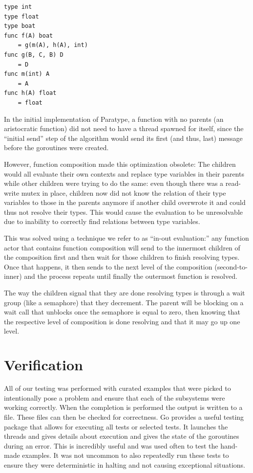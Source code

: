 \documentclass{acm_proc_article-sp}
\begin{document}
		\begin{lstlisting}[caption=Small Example of function composition,
		language=Paratype, label=lst:composition] 
type int
type float
type boat
func f(A) boat
	= g(m(A), h(A), int)
func g(B, C, B) D
	= D
func m(int) A
	= A
func h(A) float
	= float
		\end{lstlisting}

		In the initial implementation of Paratype, a function with no parents
		(an aristocratic function) did not need to have a thread spawned for
		itself, since the ``initial send'' step of the algorithm would send its
		first (and thus, last) message before the goroutines were created.

		However, function composition made this optimization obsolete: The
		children would all evaluate their own contexts and replace type
		variables in their parents while other children were trying to do the
		same: even though there was a read-write mutex in place, children now
		did not know the relation of their type variables to those in the
		parents anymore if another child overwrote it and could thus not
		resolve their types. This would cause the evaluation to be unresolvable
		due to inability to correctly find relations between type variables.

		This was solved using a technique we refer to as ``in-out evaluation:''
		any function actor that contains function composition will send to the
		innermost children of the composition first and then wait for those
		children to finish resolving types. Once that happens, it then sends
		to the next level of the composition (second-to-inner) and the process
		repeats until finally the outermost function is resolved.

		The way the children signal that they are done resolving types is
		through a wait group (like a semaphore) that they decrement. The parent
		will be blocking on a wait call that unblocks once the semaphore is
		equal to zero, then knowing that the respective level of composition is
		done resolving and that it may go up one level.


\section{Verification}
	All of our testing was performed with curated examples that were picked to
	intentionally pose a problem and ensure that each of the subsystems were
	working correctly. When the completion is performed the output is written
	to a file. These files can then be checked for correctness. Go provides a
	useful testing package that allows for executing all tests or selected
	tests.  It launches the threads and gives details about execution and gives
	the state of the goroutines during an error. This is incredibly useful and
	was used often to test the hand-made examples. It was not uncommon to also
	repeatedly run these tests to ensure they were deterministic in halting and
	not causing exceptional situations.  
	
\end{document}
